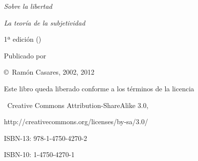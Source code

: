 \vfill
 {\sl Sobre la libertad}\par
 {\sl La teoría de la subjetividad}\par
 1ª edición (\todayiso)\par
 \null\par
 Publicado por \par
 \copyright\ Ramón Casares, 2002, 2012\par
 Este libro queda liberado conforme a los términos de la licencia\par
 \ccbysa\ {\sf Creative Commons Attribution-ShareAlike 3.0},\par
     {http://creativecommons.org/licenses/by-sa/3.0/}\par
 \null\par
 ISBN-13: 978-1-4750-4270-2\par
 ISBN-10: 1-4750-4270-1\par


\break %

\null
\vfil
{}
\vfil

\vfil
\break

\null\vfill\break %

\endinput
